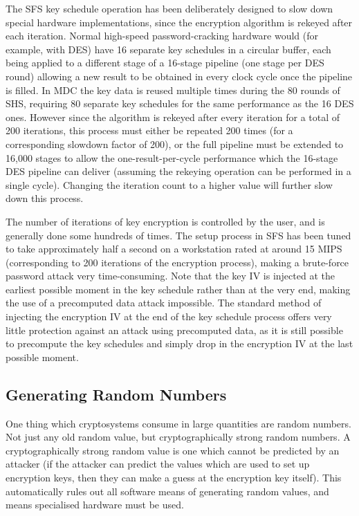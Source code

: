 The SFS key schedule operation has been deliberately designed to slow down
special hardware implementations, since the encryption algorithm is rekeyed
after each iteration.  Normal high-speed password-cracking hardware would (for
example, with DES) have 16 separate key schedules in a circular buffer, each
being applied to a different stage of a 16-stage pipeline (one stage per DES
round) allowing a new result to be obtained in every clock cycle once the
pipeline is filled.  In MDC the key data is reused multiple times during the 80
rounds of SHS, requiring 80 separate key schedules for the same performance as
the 16 DES ones.  However since the algorithm is rekeyed after every iteration
for a total of 200 iterations, this process must either be repeated 200 times
(for a corresponding slowdown factor of 200), or the full pipeline must be
extended to 16,000 stages to allow the one-result-per-cycle performance which
the 16-stage DES pipeline can deliver (assuming the rekeying operation can be
performed in a single cycle).  Changing the iteration count to a higher value
will further slow down this process.

The number of iterations of key encryption is controlled by the user, and is
generally done some hundreds of times.  The setup process in SFS has been tuned
to take approximately half a second on a workstation rated at around 15 MIPS
(corresponding to 200 iterations of the encryption process), making a
brute-force password attack very time-consuming.  Note that the key IV is
injected at the earliest possible moment in the key schedule rather than at the
very end, making the use of a precomputed data attack impossible.  The standard
method of injecting the encryption IV at the end of the key schedule process
offers very little protection against an attack using precomputed data, as it
is still possible to precompute the key schedules and simply drop in the
encryption IV at the last possible moment.



\subsection{Generating Random Numbers}

One thing which cryptosystems consume in large quantities are random numbers.
Not just any old random value, but cryptographically strong random numbers.  A
cryptographically strong random value is one which cannot be predicted by an
attacker (if the attacker can predict the values which are used to set up 
encryption keys, then they can make a guess at the encryption key itself).
This automatically rules out all software means of generating random values,
and means specialised hardware must be used.

